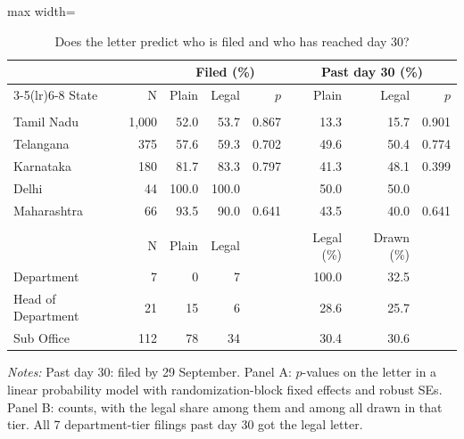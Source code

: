 \begin{table}[!htbp]
\centering
\caption{Does the letter predict who is filed and who has reached day 30?}
\label{tab:tab_balance}
\small
\begin{adjustbox}{max width=\textwidth}
\begin{threeparttable}
\begin{tabular}{lrrrrrrr}
\toprule
& & \multicolumn{3}{c}{Filed (\%)} & \multicolumn{3}{c}{Past day 30 (\%)} \\ \cmidrule(lr){3-5}\cmidrule(lr){6-8} State & N & Plain & Legal & $p$ & Plain & Legal & $p$ \\
\midrule
\addlinespace\multicolumn{8}{l}{\textit{Panel A. All drawn applications}} \\
Tamil Nadu & 1,000 & 52.0 & 53.7 & 0.867 & 13.3 & 15.7 & 0.901 \\
Telangana & 375 & 57.6 & 59.3 & 0.702 & 49.6 & 50.4 & 0.774 \\
Karnataka & 180 & 81.7 & 83.3 & 0.797 & 41.3 & 48.1 & 0.399 \\
Delhi & 44 & 100.0 & 100.0 &  & 50.0 & 50.0 &  \\
Maharashtra & 66 & 93.5 & 90.0 & 0.641 & 43.5 & 40.0 & 0.641 \\
\midrule
\addlinespace\multicolumn{8}{l}{\textit{Panel B. Tamil Nadu past day 30, by tier}} \\
 & N & Plain & Legal &  & Legal (\%) & Drawn (\%) &  \\
Department & 7 & 0 & 7 &  & 100.0 & 32.5 &  \\
Head of Department & 21 & 15 & 6 &  & 28.6 & 25.7 &  \\
Sub Office & 112 & 78 & 34 &  & 30.4 & 30.6 &  \\
\bottomrule
\end{tabular}
\begin{tablenotes}[flushleft]\footnotesize
\item \textit{Notes:} Past day 30: filed by 29 September. Panel A: $p$-values on the letter in a linear probability model with randomization-block fixed effects and robust SEs. Panel B: counts, with the legal share among them and among all drawn in that tier. All 7 department-tier filings past day 30 got the legal letter.
\end{tablenotes}
\end{threeparttable}
\end{adjustbox}
\end{table}
